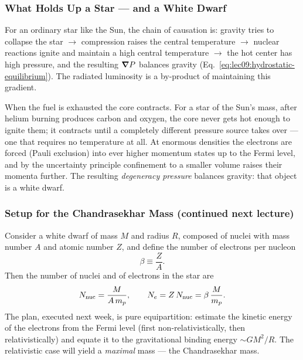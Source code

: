 
\subsubsection*{What Holds Up a Star --- and a White Dwarf}
For an ordinary star like the Sun, the chain of causation is: gravity tries to
collapse the star $\to$ compression raises the central temperature $\to$
nuclear reactions ignite and maintain a high central temperature $\to$ the hot
center has high pressure, and the resulting $\grad P$ balances gravity
(Eq.~\eqref{eq:lec09:hydrostatic-equilibrium}). The radiated luminosity is a
by-product of maintaining this gradient.

When the fuel is exhausted the core contracts. For a star of the Sun's mass,
after helium burning produces carbon and oxygen, the core never gets hot
enough to ignite them; it contracts until a completely different pressure
source takes over --- one that requires no temperature at all. At enormous
densities the electrons are forced (Pauli exclusion) into ever higher momentum
states up to the Fermi level, and by the uncertainty principle confinement to
a smaller volume raises their momenta further. The resulting
\emph{degeneracy pressure} balances gravity: that object is a white dwarf.

\subsubsection*{Setup for the Chandrasekhar Mass (continued next lecture)}
Consider a white dwarf of mass $M$ and radius $R$, composed of nuclei with
mass number $A$ and atomic number $Z$, and define the number of electrons per
nucleon
\begin{equation}
    \beta\equiv\frac{Z}{A}.
    \label{eq:lec09:beta-definition}
\end{equation}
Then the number of nuclei and of electrons in the star are
\begin{equation}
    N_{\rm nuc}=\frac{M}{A\,m_p},
    \qquad
    N_e=Z\,N_{\rm nuc}=\beta\,\frac{M}{m_p}.
    \label{eq:lec09:electron-count}
\end{equation}
The plan, executed next week, is pure equipartition: estimate the kinetic
energy of the electrons from the Fermi level (first non-relativistically, then
relativistically) and equate it to the gravitational binding energy
$\sim GM^2/R$. The relativistic case will yield a \emph{maximal} mass --- the
Chandrasekhar mass.

